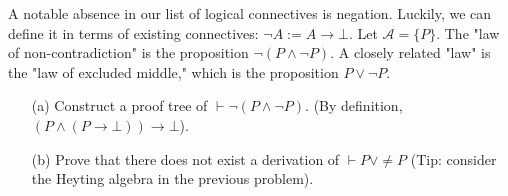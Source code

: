 \documentclass{article}
\begin{document}
\newpage

\begin{ques}
    A notable absence in our list of logical connectives is negation. Luckily, we can define it in terms of existing connectives: $\neg A:=A \rightarrow \bot$. Let $\mathcal{A}=\{P\}$. The "law of non-contradiction" is the proposition $\neg(P\wedge \neg P)$. A closely related "law" is the "law of excluded middle," which is the proposition $P\vee \neg P$.
    \begin{itemize}
        \item[(a)] Construct a proof tree of $\vdash \neg(P \wedge \neg P)$. (By definition, $(P \wedge (P\rightarrow \bot))\rightarrow \bot$). 
        \item[(b)] Prove that there does not exist a derivation of $\vdash P\vee \neq P$ (Tip: consider the Heyting algebra in the previous problem). 
    \end{itemize}
\end{ques}\label{q2}
\end{document}
